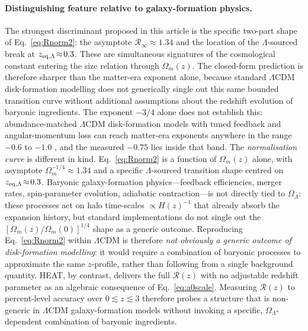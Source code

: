 \documentclass[twocolumn,letterpaper]{aastex631}
\newcommand{\lcdm}{\Lambda\mathrm{CDM}}
\begin{document}
\paragraph{Distinguishing feature relative to galaxy-formation
physics.}
The strongest discriminant proposed in this article is the
specific two-part shape of Eq.~\ref{eq:Rnorm2}: the asymptote
$\mathcal{R}_{\infty}\!\approx\!1.34$ and the location of the
$\Lambda$-sourced break at
$z_{\rm eq,\Lambda}\!\approx\!0.3$.  These are simultaneous
signatures of the cosmological constant entering the size
relation through $\Omega_{m}(z)$.  The closed-form prediction is
therefore sharper than the matter-era exponent alone, because
standard $\lcdm$ disk-formation modelling does not generically
single out this same bounded transition curve without additional
assumptions about the redshift evolution of baryonic ingredients.
The exponent $-3/4$ alone does not
establish this: abundance-matched $\lcdm$ disk-formation models
with tuned feedback and angular-momentum loss can reach
matter-era exponents anywhere in the range $-0.6$ to $-1.0$
\citep{Somerville2018,MoMaoWhite1998}, and the measured $-0.75$
lies inside that band.  The \emph{normalisation curve} is
different in kind.  Eq.~\ref{eq:Rnorm2} is a function of
$\Omega_{m}(z)$ alone, with asymptote
$\Omega_{m}^{-1/4}\!\approx\!1.34$ and a specific
$\Lambda$-sourced transition shape centred on
$z_{\rm eq,\Lambda}\!\approx\!0.3$.  Baryonic galaxy-formation
physics---feedback efficiencies, merger rates, spin-parameter
evolution, adiabatic contraction---is not directly tied to
$\Omega_{\Lambda}$: these processes act on halo time-scales
$\propto H(z)^{-1}$ that already absorb the expansion history,
but standard implementations do not single out the
$[\Omega_{m}(z)/\Omega_{m}(0)]^{1/4}$ shape as a generic outcome.
Reproducing Eq.~\ref{eq:Rnorm2} within $\lcdm$ is therefore
\emph{not obviously a generic outcome of disk-formation
modelling}: it would require a combination of baryonic
processes to approximate the same $z$-profile, rather than
following from a single background quantity.  HEAT, by contrast,
delivers the full $\mathcal{R}(z)$ with no adjustable redshift
parameter as an algebraic
consequence of Eq.~\ref{eq:a0scale}.  Measuring $\mathcal{R}(z)$ to
percent-level accuracy over $0\!\lesssim\!z\!\lesssim\!3$
therefore probes a structure that is non-generic in $\lcdm$
galaxy-formation models without invoking a specific,
$\Omega_\Lambda$-dependent combination of baryonic ingredients.
\end{document}
